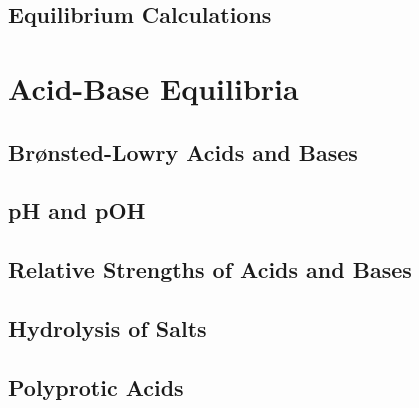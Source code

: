 \documentclass[12pt, openany, letterpaper]{memoir}
\begin{document}
\section{Equilibrium Calculations}

\chapter{Acid-Base Equilibria}

\section{Brønsted-Lowry Acids and Bases}

\section{pH and pOH}

\section{Relative Strengths of Acids and Bases}

\section{Hydrolysis of Salts}

\section{Polyprotic Acids}
\end{document}
